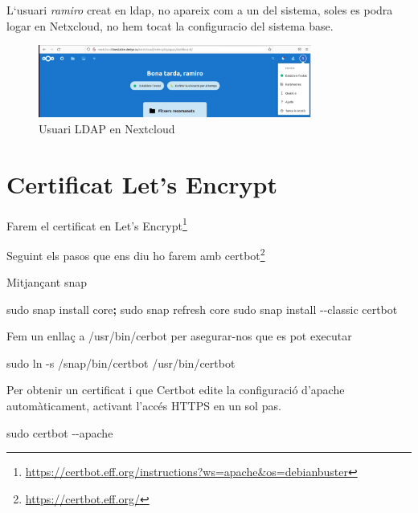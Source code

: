 \documentclass[
  10pt,
]{krantz}
\newenvironment{Shaded}{\begin{snugshade}}{\end{snugshade}}
\newcommand{\AttributeTok}[1]{\textcolor[rgb]{0.77,0.63,0.00}{#1}}
\newcommand{\FunctionTok}[1]{\textcolor[rgb]{0.00,0.00,0.00}{#1}}
\newcommand{\KeywordTok}[1]{\textcolor[rgb]{0.13,0.29,0.53}{\textbf{#1}}}
\newcommand{\NormalTok}[1]{#1}
\DeclareRobustCommand{\href}[2]{#2\footnote{\url{#1}}}
\begin{document}
L`usuari \emph{ramiro} creat en ldap, no apareix com a un del sistema, soles es podra logar en Netxcloud, no hem tocat la configuracio del sistema base.

\begin{figure}
\centering
\includegraphics[width=0.8\textwidth,height=\textheight]{imatges/proxmox/Ususari_nest_LDAP.png}
\caption{Usuari LDAP en Nextcloud}
\end{figure}

\hypertarget{certificat-lets-encrypt}{%
\section{Certificat Let's Encrypt}\label{certificat-lets-encrypt}}

Farem el certificat en \href{https://certbot.eff.org/instructions?ws=apache\&os=debianbuster}{Let's Encrypt}

Seguint els pasos que ens diu ho farem amb \href{https://certbot.eff.org/}{certbot}

Mitjançant snap

\begin{Shaded}
\begin{Highlighting}[]
\FunctionTok{sudo}\NormalTok{ snap install core}\KeywordTok{;} \FunctionTok{sudo}\NormalTok{ snap refresh core}
\FunctionTok{sudo}\NormalTok{ snap install }\AttributeTok{{-}{-}classic}\NormalTok{ certbot}
\end{Highlighting}
\end{Shaded}

Fem un enllaç a /usr/bin/cerbot per asegurar-nos que es pot executar

\begin{Shaded}
\begin{Highlighting}[]
\FunctionTok{sudo}\NormalTok{ ln }\AttributeTok{{-}s}\NormalTok{ /snap/bin/certbot /usr/bin/certbot}
\end{Highlighting}
\end{Shaded}

Per obtenir un certificat i que Certbot edite la configuració d'apache automàticament, activant l'accés HTTPS en un sol pas.

\begin{Shaded}
\begin{Highlighting}[]
\FunctionTok{sudo}\NormalTok{ certbot }\AttributeTok{{-}{-}apache}
\end{Highlighting}
\end{Shaded}
\end{document}
